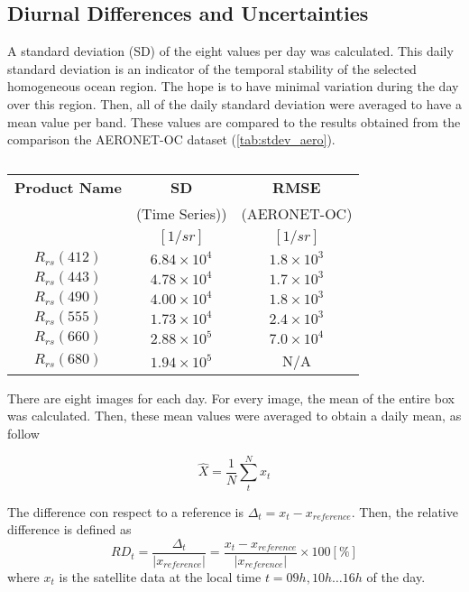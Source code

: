 \documentclass[onecolumn,3p,letterpaper,11pt]{elsarticle}
\begin{document}

\subsection{Diurnal Differences and Uncertainties}
A standard deviation (SD) of the eight values per day was calculated. This daily standard deviation is an indicator of the temporal stability of the selected homogeneous ocean region. The hope is to have minimal variation during the day over this region. Then, all of the daily standard deviation were averaged to have a mean value per band. These values are compared to the results obtained from the comparison the AERONET-OC dataset (\autoref{tab:stdev_aero}).

\begin{table}[htbp!]
\caption{ \label{tab:stdev_aero} } 
\small
\centering
\begin{tabular}{ccc} \hline
 \bfseries{Product Name} & \bfseries{SD} & \bfseries{RMSE}\\
 & (Time Series)) & (AERONET-OC) \\ 
 & $[1/sr]$ & $[1/sr]$ \\ \hline \hline
$R_{rs}(412)$ & $6.84\times10^4$ & $1.8\times10^3$\\ 
$R_{rs}(443)$ & $4.78\times10^4$ & $1.7\times10^3$\\ 
$R_{rs}(490)$ & $4.00\times10^4$ & $1.8\times10^3$\\ 
$R_{rs}(555)$ & $1.73\times10^4$ & $2.4\times10^3$\\ 
$R_{rs}(660)$ & $2.88\times10^5$ & $7.0\times10^4$\\ 
$R_{rs}(680)$ & $1.94\times10^5$ & N/A \\ \hline
 \end{tabular}
\end{table}



There are eight images for each day. For every image, the mean of the entire box was calculated. Then, these mean values were averaged to obtain a daily mean, as follow

\begin{equation}
	\hat{X} = \frac{1}{N} \sum_{t}^N x_t
\end{equation}

The difference con respect to a reference is $\Delta_t=x_t-x_{reference}$. Then, the relative difference is defined as
\begin{equation}
	RD_t = \frac{\Delta_t}{|x_{reference}|} = \frac{x_t-x_{reference}}{|x_{reference}|}
	\times 100[\%]
\end{equation}
where $x_t$ is the satellite data at the local time $t=09h,10h\dots16h$ of the day.
\end{document}
